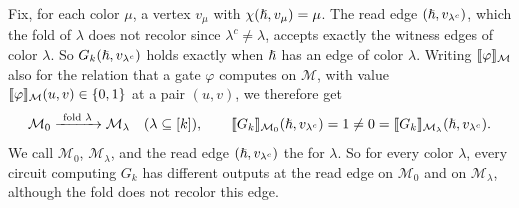 Fix, for each color $\mu$, a vertex $v_\mu$ with $\chi(\hslash,v_\mu)=\mu$.
The read edge $(\hslash,v_{\lambda^c})$, which the fold of $\lambda$ does not
recolor since $\lambda^c\ne\lambda$, accepts exactly the witness edges of
color $\lambda$. So $G_k(\hslash,v_{\lambda^c})$ holds exactly when $\hslash$
has an edge of color $\lambda$. Writing $\llbracket \varphi\rrbracket_{\mathcal M}$ also for
the relation that a gate $\varphi$ computes on $\mathcal M$, with value
$\llbracket \varphi\rrbracket_{\mathcal M}(u,v)\in\{0,1\}$ at a pair $(u,v)$, we therefore
get
\[
 \mathcal M_0\xrightarrow{\ \text{fold }\lambda\ }\mathcal M_\lambda
 \quad(\lambda\subseteq[k]),\qquad
 \sem{G_k}{\mathcal M_0}(\hub,v_{\lambda^c})=1\ne0
 =\sem{G_k}{\mathcal M_\lambda}(\hub,v_{\lambda^c}).
\]
We call $\mathcal M_0$, $\mathcal M_\lambda$, and the read edge
$(\hslash,v_{\lambda^c})$ the  for $\lambda$. So for every color
$\lambda$, every circuit computing $G_k$ has different outputs at the read
edge on $\mathcal M_0$ and on $\mathcal M_\lambda$, although the fold does
not recolor this edge.
\fi





